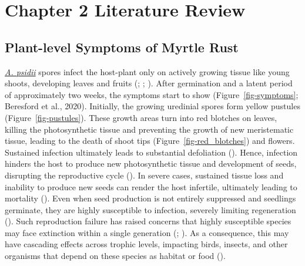 \documentclass[
]{scrreprt}
\begin{document}
\chapter{Chapter 2 Literature Review}\label{literature-review}

\section{Plant-level Symptoms of Myrtle
Rust}\label{plant-level-symptoms-of-myrtle-rust}

\hyperref[acronyms_AP]{\emph{A. psidii}} spores infect the host-plant
only on actively growing tissue like young shoots, developing leaves and
fruits (; ;
). After
germination and a latent period of approximately two weeks, the symptoms
start to show (Figure~\ref{fig-symptoms}; Beresford et al., 2020).
Initially, the growing uredinial spores form yellow pustules
(Figure~\ref{fig-pustules}). These growth areas turn into red blotches
on leaves, killing the photosynthetic tissue and preventing the growth
of new meristematic tissue, leading to the death of shoot tips
(Figure~\ref{fig-red_blotches}) and flowers. Sustained infection
ultimately leads to substantial defoliation
().
Hence, infection hinders the host to produce new photosynthetic tissue
and development of seeds, disrupting the reproductive cycle
(). In severe cases, sustained tissue loss and
inability to produce new seeds can render the host infertile, ultimately
leading to mortality
(). Even when seed production is not entirely
suppressed and seedlings germinate, they are highly susceptible to
infection, severely limiting regeneration
(). Such reproduction failure has raised concerns that highly
susceptible species may face extinction within a single generation
(;
). As a consequence, this may have cascading effects
across trophic levels, impacting birds, insects, and other organisms
that depend on these species as habitat or food
().
\end{document}
